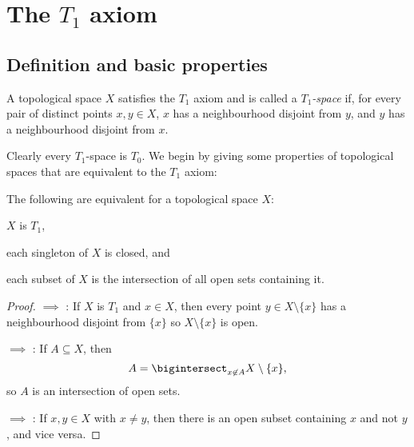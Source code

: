 \documentclass[article, a4paper, 11pt, oneside]{memoir}
\numberwithin{equation}{chapter}
\begin{document}
\chapter[The T1 axiom]{The $T_1$ axiom}

\section{Definition and basic properties}

\begin{definition}
    A topological space $X$ satisfies the $T_1$ axiom and is called a \emph{$T_1$-space} if, for every pair of distinct points $x,y \in X$, $x$ has a neighbourhood disjoint from $y$, and $y$ has a neighbourhood disjoint from $x$.
\end{definition}
%
Clearly every $T_1$-space is $T_0$. We begin by giving some properties of topological spaces that are equivalent to the $T_1$ axiom:

\begin{proposition}
    The following are equivalent for a topological space $X$:
    \begin{enumprop}
        \item \label{enum:T1-space} $X$ is $T_1$,
        \item \label{enum:T1-singletons-closed} each singleton of $X$ is closed, and
        \item \label{enum:T1-intersection-of-open-sets} each subset of $X$ is the intersection of all open sets containing it.
    \end{enumprop}
\end{proposition}

\begin{proof}
     $\implies$ : If $X$ is $T_1$ and $x \in X$, then every point $y \in X \setminus \{x\}$ has a neighbourhood disjoint from $\{x\}$ so $X \setminus \{x\}$ is open.

     $\implies$ : If $A \subseteq X$, then
    \begin{equation*}
        A = \bigintersect_{x \not\in A} X \setminus \{x\},
    \end{equation*}
    so $A$ is an intersection of open sets.

     $\implies$ : If $x,y \in X$ with $x \neq y$, then there is an open subset containing $x$ and not $y$, and vice versa.
\end{proof}
\end{document}
